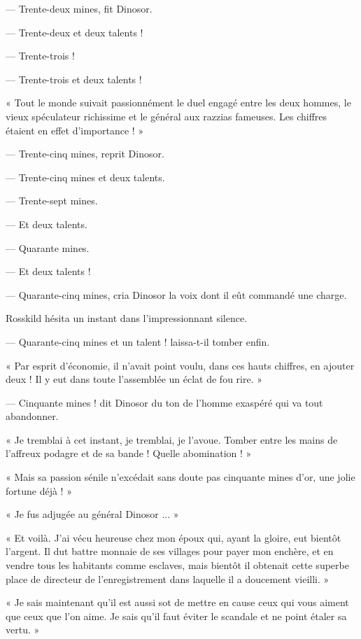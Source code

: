 \documentclass[a4paper, 11pt, oneside, polutonikogreek, french]{article}
\begin{document}
--- Trente-deux mines, fit Dinosor.

--- Trente-deux et deux talents !

--- Trente-trois !

--- Trente-trois et deux talents !

« Tout le monde suivait passionnément le duel engagé entre les deux hommes, le vieux spéculateur richissime et le général aux razzias fameuses. Les chiffres étaient en effet d'importance ! »

--- Trente-cinq mines, reprit Dinosor.

--- Trente-cinq mines et deux talents.

--- Trente-sept mines.

--- Et deux talents.

--- Quarante mines.

--- Et deux talents !

--- Quarante-cinq mines, cria Dinosor la voix dont il eût commandé une charge.

Rosskild hésita un instant dans l'impressionnant silence.

--- Quarante-cinq mines et un talent ! laissa-t-il tomber enfin.

« Par esprit d'économie, il n'avait point voulu, dans ces hauts chiffres, en ajouter deux ! Il y eut dans toute l'assemblée un éclat de fou rire. »

--- Cinquante mines ! dit Dinosor du ton de l'homme exaspéré qui va tout abandonner.

« Je tremblai à cet instant, je tremblai, je l'avoue. Tomber entre les mains de l'affreux podagre et de sa bande ! Quelle abomination ! »

« Mais sa passion sénile n'excédait sans doute pas cinquante mines d'or, une jolie fortune déjà ! »

« Je fus adjugée au général Dinosor ... »

\bigskip
\centerline{\EightStarTaper}
\centerline{\EightStarTaper\EightStarTaper}
\bigskip

« Et voilà. J'ai vécu heureuse chez mon époux qui, ayant la gloire, eut bientôt l'argent. Il dut battre monnaie de ses villages pour payer mon enchère, et en vendre tous les habitants comme esclaves, mais bientôt il obtenait cette superbe place de directeur de l'enregistrement dans laquelle il a doucement vieilli. »

« Je sais maintenant qu'il est aussi sot de mettre en cause ceux qui vous aiment que ceux que l'on aime. Je sais qu'il faut éviter le scandale et ne point étaler sa vertu. »
\clearpage
\end{document}
